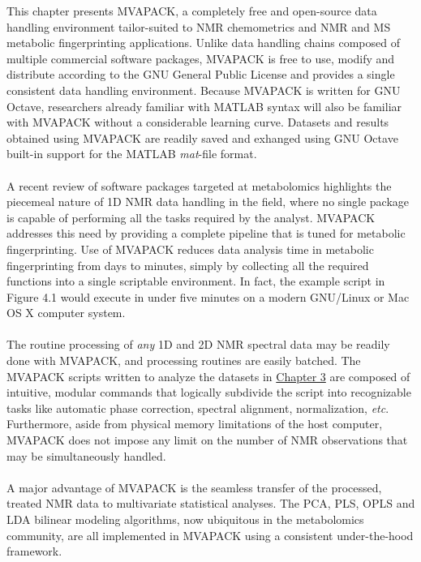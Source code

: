 \begin{doublespace}
This chapter presents MVAPACK, a completely free and open-source data handling
environment tailor-suited to NMR chemometrics and \hnmr{} NMR and MS metabolic
fingerprinting applications. Unlike data handling chains composed of multiple
commercial software packages, MVAPACK is free to use, modify and distribute
according to the GNU General Public License \cite{gpl3} and provides a single
consistent data handling environment. Because MVAPACK is written for GNU
Octave, researchers already familiar with MATLAB syntax will also be familiar
with MVAPACK without a considerable learning curve. Datasets and results
obtained using MVAPACK are readily saved and exhanged using GNU Octave built-in
support for the MATLAB {\it mat}-file format.
\\\\
A recent review \cite{izquierdo:pnmrs2011} of software packages targeted at
metabolomics highlights the piecemeal nature of 1D \hnmr{} NMR data handling
in the field, where no single package is capable of performing all the tasks
required by the analyst. MVAPACK addresses this need by providing a complete
pipeline that is tuned for metabolic fingerprinting. Use of MVAPACK reduces
data analysis time in metabolic fingerprinting from days to minutes, simply
by collecting all the required functions into a single scriptable environment.
In fact, the example script in Figure 4.1 would execute in under five minutes
on a modern GNU/Linux or Mac OS X computer system.
\\\\
The routine processing of {\it any} 1D and 2D NMR spectral data may be readily
done with MVAPACK, and processing routines are easily batched. The MVAPACK
scripts written to analyze the datasets in \hyperlink{chapter.3}{Chapter 3}
are composed of intuitive, modular commands that logically subdivide the script
into recognizable tasks like automatic phase correction, spectral alignment,
normalization, {\it etc}. Furthermore, aside from physical memory limitations
of the host computer, MVAPACK does not impose any limit on the number of NMR
observations that may be simultaneously handled.
\\\\
A major advantage of MVAPACK is the seamless transfer of the processed, treated
NMR data to multivariate statistical analyses. The PCA, PLS, OPLS and LDA
bilinear modeling algorithms, now ubiquitous in the metabolomics community,
are all implemented in MVAPACK using a consistent under-the-hood framework.

\end{doublespace}
